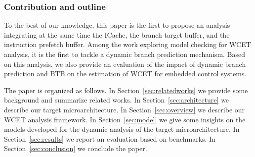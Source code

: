 \subsubsection{Contribution and outline}
To the best of our knowledge, this paper is the first to propose an analysis integrating at the same time the ICache, the branch target buffer, and the instruction prefetch buffer.
Among the work exploring model checking for WCET analysis, it is the first to tackle a dynamic branch prediction mechanism.
Based on this analysis, we also provide an evaluation of the impact of dynamic branch prediction and BTB on the estimation of WCET for embedded control systems.

The paper is organized as follows. 
In Section~\ref{sec:relatedworks} we provide some background and summarize related works.
In Section~\ref{sec:architecture} we describe our target microarchitecture.
In Section~\ref{sec:overview} we describe our WCET analysis framework.
In Section~\ref{sec:model} we give some insights on the models developed for the dynamic analysis of the target microarchitecture.
In Section~\ref{sec:results} we report an evaluation based on benchmarks. 
In Section~\ref{sec:conclusion} we conclude the paper.

